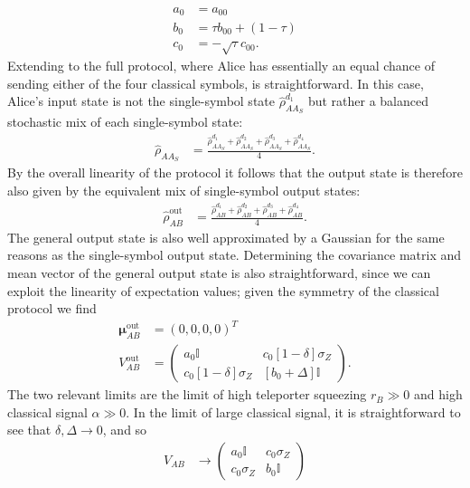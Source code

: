 \documentclass[%
 reprint,
 superscriptaddress,
 amsmath,
 amssymb,
 aps,
 pra,
]{revtex4-2}
\newcommand{\id}{\mathbb{I}}
\newcommand{\sz}{\sigma_Z}
\begin{document}
\begin{align}
    a_0 &= a_{00} \\
    b_0 &= \tau b_{00} + (1 - \tau) \\
    c_0 &= -\sqrt{\tau} c_{00}.
\end{align}
Extending to the full protocol, where Alice has essentially an equal chance of sending either of the four classical symbols, is straightforward. In this case, Alice's input state is not the single-symbol state $\hat \rho_{AA_S}^{d_1}$ but rather a balanced stochastic mix of each single-symbol state:
\begin{align}
    \hat \rho_{AA_S} &= \frac{\hat \rho_{AA_S}^{d_1} + \hat \rho_{AA_S}^{d_2} + \hat \rho_{AA_S}^{d_3} + \hat \rho_{AA_S}^{d_4}}{4}.
\end{align}
By the overall linearity of the protocol it follows that the output state is therefore also given by the equivalent mix of single-symbol output states:
\begin{align}
    \hat \rho_{AB}^\mathrm{out} &= \frac{\hat \rho_{AB}^{d_1} + \hat \rho_{AB}^{d_2} + \hat \rho_{AB}^{d_3} + \hat \rho_{AB}^{d_4}}{4}.
\end{align}
The general output state is also well approximated by a Gaussian for the same reasons as the single-symbol output state. Determining the covariance matrix and mean vector of the general output state is also straightforward, since we can exploit the linearity of expectation values; given the symmetry of the classical protocol we find
\begin{align}
    \bm{\mu}_{AB}^\mathrm{out} &= \left( 0, 0, 0, 0 \right)^T \\
    V_{AB}^\mathrm{out} &= \begin{pmatrix}
            a_{0} \id & c_0 \left[ 1 - \delta \right]\sz \\
            c_0 \left[ 1 - \delta \right]\sz & \left[b_0 + \Delta\right] \id
        \end{pmatrix}.
\end{align}
The two relevant limits \cite{zaunders_generalised_2026} are the limit of high teleporter squeezing $r_B \gg 0$ and high classical signal $\alpha \gg 0$. In the limit of large classical signal, it is straightforward to see that $\delta, \Delta \longrightarrow 0$, and so
\begin{align}
    V_{AB} &\longrightarrow \begin{pmatrix}
        a_0 \id & c_0 \sz \\
        c_0 \sz & b_0 \id
    \end{pmatrix}
\end{align}
\end{document}
